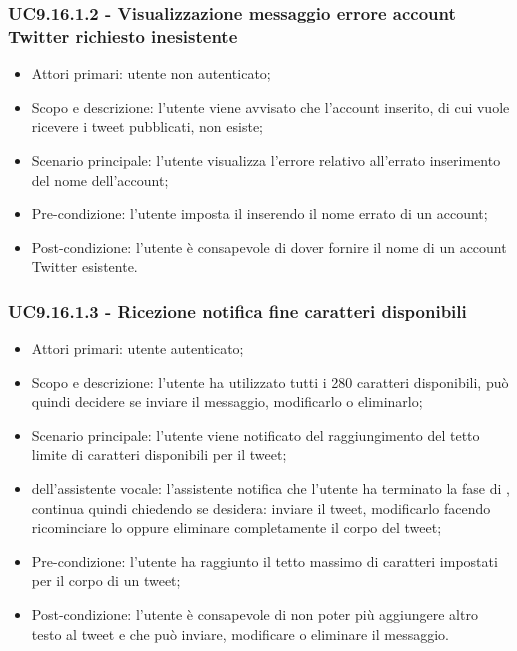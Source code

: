 \subsubsection{UC9.16.1.2 - Visualizzazione messaggio errore account Twitter richiesto inesistente}
\begin{itemize}
	\item  Attori primari: utente non autenticato;
	\item  Scopo e descrizione: l'utente viene avvisato che l'account inserito, di cui vuole ricevere i tweet pubblicati, non esiste;
	\item  Scenario principale: l'utente visualizza l'errore relativo all'errato inserimento del nome dell'account;
	\item  Pre-condizione: l'utente imposta il  inserendo il nome errato di un account;
	\item  Post-condizione: l'utente è consapevole di dover fornire il nome di un account Twitter esistente.
\end{itemize}
\subsubsection{UC9.16.1.3 - Ricezione notifica fine caratteri disponibili}
\begin{itemize}
	\item  Attori primari: utente autenticato;
	\item  Scopo e descrizione: l'utente ha utilizzato tutti i 280 caratteri disponibili, può quindi decidere se inviare il messaggio, modificarlo o eliminarlo;
	\item  Scenario principale: l'utente viene notificato del raggiungimento del tetto limite di caratteri disponibili per il tweet;
	\item  {} dell'assistente vocale: l'assistente notifica che l'utente ha terminato la fase di , continua quindi chiedendo se desidera: inviare il tweet, modificarlo facendo ricominciare lo  oppure eliminare completamente il corpo del tweet;
	\item  Pre-condizione: l'utente ha raggiunto il tetto massimo di caratteri impostati per il corpo di un tweet;
	\item  Post-condizione: l'utente è consapevole di non poter più aggiungere altro testo al tweet e che può inviare, modificare o eliminare il messaggio.
\end{itemize}
